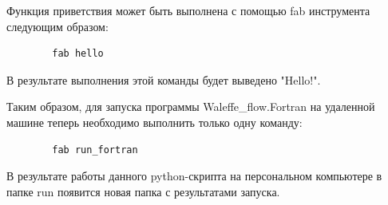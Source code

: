  Функция приветствия может быть выполнена с помощью fab инструмента следующим образом:
\begin{verbatim}
        fab hello \end{verbatim}

В результате выполнения этой команды будет выведено "Hello!".


Таким образом, для запуска программы Waleffe\_flow.Fortran на удаленной машине теперь необходимо выполнить только одну команду:
\begin{verbatim}
        fab run_fortran \end{verbatim}
        
В результате работы данного python-скрипта на персональном компьютере в папке run появится новая папка с результатами запуска.

